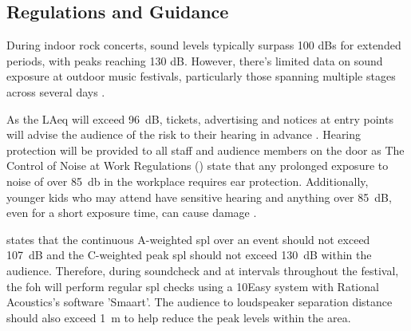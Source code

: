     \subsection{Regulations and Guidance}
        During indoor rock concerts, sound levels typically surpass 100 dBs for extended periods, with peaks reaching 130 dB. However, there's limited data on sound exposure at outdoor music festivals, particularly those spanning multiple stages across several days \citep{rmbrecht2023}.

        As the LAeq will exceed \SI{96}{\dB}, tickets, advertising and notices at entry points will advise the audience of the risk to their hearing in advance \citep{hse-event-safety-noise}. Hearing protection will be provided to all staff and audience members on the door as The Control of Noise at Work Regulations (\citeyear{hse2005}) state that any prolonged exposure to noise of over \SI{85}{\decibel} in the workplace requires ear protection. Additionally, younger kids who may attend have sensitive hearing and anything over \SI{85}{\dB}, even for a short exposure time, can cause damage \citep{rmbrecht2023}.

        \citet{hse-event-safety-noise} states that the continuous A-weighted \acrshort{spl} over an event should not exceed \SI{107}{\dB} and the C-weighted peak \acrshort{spl} should not exceed \SI{130}{\dB} within the audience. Therefore, during soundcheck and at intervals throughout the festival, the \acrshort{foh} will perform regular \acrshort{spl} checks using a 10Easy system with Rational Acoustics's software 'Smaart'. The audience to loudspeaker separation distance should also exceed \SI{1}{\metre} to help reduce the peak levels within the area.